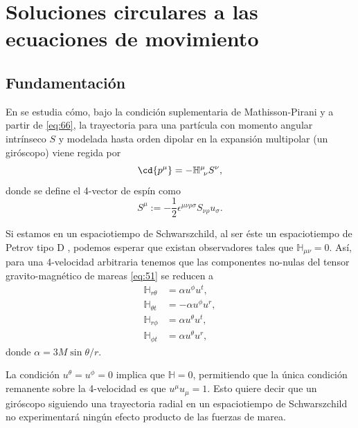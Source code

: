 \chapter{Soluciones circulares a las ecuaciones de movimiento}
\label{cap:4}
\newpage

\section{Fundamentación}

En \cite{Costa-Natario-Zilhao} se estudia cómo, bajo la condición suplementaria de Mathisson-Pirani y a partir de \eqref{eq:66}, la trayectoria para una partícula con momento angular intrínseco $S$ y modelada hasta orden dipolar en la expansión multipolar (un giróscopo) viene regida por
\begin{equation}
\cd{p^{\mu}} = -\mathbb{H}^{\mu}_{\ \nu} S^{\nu},
\end{equation}
donde se define el 4-vector de espín como $$S^{\mu} := -\frac{1}{2} \epsilon^{\mu \nu \rho \sigma} S_{\nu \rho} u_{\sigma}.$$

Si estamos en un espaciotiempo de Schwarszchild, al ser éste un espaciotiempo de Petrov tipo D \cite{Pravda}, podemos esperar que existan observadores tales que $\mathbb{H}_{\mu \nu}=0$. Así, para una 4-velocidad arbitraria tenemos que las componentes no-nulas del tensor gravito-magnético de mareas \eqref{eq:51} se reducen a
\begin{align}
\mathbb{H}_{r \theta} &= \alpha u^{\phi} u^{t},\\
\mathbb{H}_{\theta t} &= -\alpha u^{\phi} u^{r},\\
\mathbb{H}_{r \phi} &= \alpha u^{\theta} u^{t},\\
\mathbb{H}_{\phi t} &= \alpha u^{\theta} u^{r},
\end{align}
donde $\alpha=3M\sin\theta /r$.

La condición $u^{\theta} = u^{\phi} = 0$ implica que $\mathbb{H}=0$, permitiendo que la única condición remanente sobre la 4-velocidad es que $u^{\mu} u_{\mu} = 1$. Esto quiere decir que un giróscopo siguiendo una trayectoria radial en un espaciotiempo de Schwarszchild no experimentará ningún efecto producto de las fuerzas de marea.

